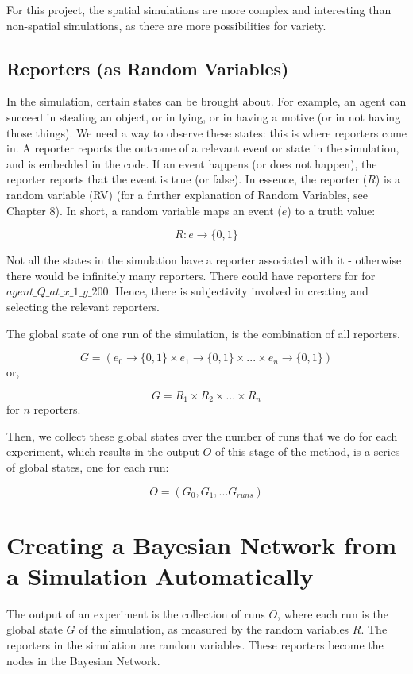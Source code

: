 For this project, the spatial simulations are more complex and interesting than non-spatial simulations, as there are more possibilities for variety.


\subsection{Reporters (as Random Variables)}

In the simulation, certain states can be brought about. For example, an agent can succeed in stealing an object, or in lying, or in having a motive (or in not having those things). We need a way to observe these states: this is where reporters come in. A reporter reports the outcome of a relevant event or state in the simulation, and is embedded in the code. If an event happens (or does not happen), the reporter reports that the event is true (or false). In essence, the reporter ($R$) is a random variable (RV) (for a further explanation of Random Variables, see Chapter 8). In short, a random variable maps an event ($e$) to a truth value:

\[ R : e \rightarrow \{0, 1\} \]

Not all the states in the simulation have a reporter associated with it - otherwise there would be infinitely many reporters. There could have reporters for for $agent\_Q\_at\_x\_1\_y\_200$. Hence, there is subjectivity involved in creating and selecting the relevant reporters.

The global state of one run of the simulation, is the combination of all reporters.

\[ G = (e_0 \rightarrow \{0, 1\} \times e_1 \rightarrow \{0, 1\} \times ... \times e_n \rightarrow \{0, 1\})\]
 or,
 
\[ G = R_1 \times R_2 \times... \times R_n\]
for $n$ reporters.

Then, we collect these global states over the number of runs that we do for each experiment, which results in the output $O$ of this stage of the method, is a series of global states, one for each run:

\[ O = (G_0, G_1, ... G_{runs})\]


\section{Creating a Bayesian Network from a Simulation Automatically}

The output of an experiment is the collection of runs $O$, where each run is the global state $G$ of the simulation, as measured by the random variables $R$. The reporters in the simulation are random variables. These reporters become the nodes in the Bayesian Network.

